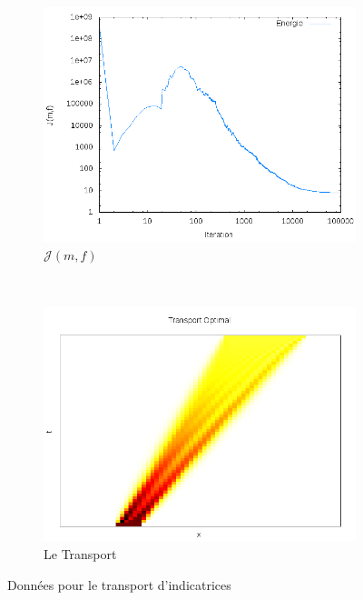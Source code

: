 \documentclass[a4paper,12pt]{article}
\begin{document}
\begin{figure}[!h]
	\begin{subfigure}[b]{0.48\linewidth}
	\includegraphics[width=\textwidth]{img/1DIndicatrix/energie.png}
	\caption{$\mathcal{J}(m,f)$}
	\end{subfigure}
	~
	\begin{subfigure}[b]{0.48\linewidth}
	\includegraphics[width=\textwidth]{img/1DIndicatrix/transport.png}
	\caption{Le Transport}
	\end{subfigure}	
	\caption{Données pour le transport d'indicatrices}
\end{figure}
\newpage
\end{document}
